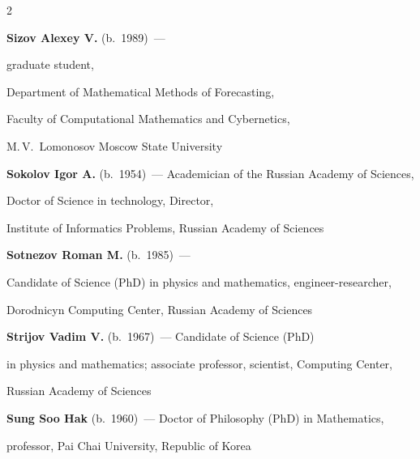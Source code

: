 \begin{multicols}{2}
\vspace*{4pt}



\noindent

\textbf{Sizov Alexey V.} (b.\ 1989)~--- 

graduate student,

Department of Mathematical Methods of Forecasting,

Faculty of Computational Mathematics and Cybernetics, 

M.\,V.~Lomonosov Moscow State University



\vspace*{4pt}



\noindent 

\textbf{Sokolov Igor A.} (b.\ 1954)~--- Academician of the Russian Academy of Sciences,

Doctor of Science in technology, Director,

Institute of Informatics Problems,  Russian Academy of Sciences





\columnbreak



\noindent

\textbf{Sotnezov Roman M.} (b.\ 1985)~--- 

Candidate of Science (PhD) in physics and mathematics, engineer-researcher,

Dorodnicyn Computing Center, Russian Academy of Sciences 



\vspace*{4pt}



\noindent

\textbf{Strijov Vadim V.} (b.\ 1967)~--- Candidate of Science (PhD)

in physics  and mathematics; associate professor, scientist, Computing Center, 

Russian Academy of Sciences



\vspace*{4pt}



\noindent

\textbf{Sung Soo Hak} (b.\ 1960)~--- Doctor of Philosophy (PhD) in Mathematics,

professor, Pai Chai University, Republic of Korea




\end{multicols}
